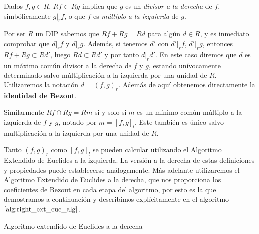 Dados \(f,g \in R\), \(Rf \subset Rg\) implica que \(g\) es un \textit{divisor a la derecha} de \(f\), simbólicamente \(g|_{r} f\), o que \(f\) es \textit{múltiplo a la izquierda} de \(g\).

Por ser \(R\) un DIP sabemos que \(Rf + Rg = Rd\) para algún \(d \in R\), y es inmediato comprobar que \(d |_r f\) y  \(d |_r g\). Además, si tenemos \(d'\) con \(d' |_r f\), \(d' |_r g\), entonces \(Rf + Rg \subset Rd'\), luego \(Rd \subset Rd'\) y por tanto  \(d |_r d'\). En este caso diremos que \(d\) es un máximo común divisor a la derecha de \(f\) y \(g\), estando unívocamente determinado salvo múltiplicación a la izquierda por una unidad de \(R\). Utilizaremos la notación \(d = {(f,g)}_r\). Además de aquí obtenemos directamente la \textbf{identidad de Bezout}.

Similarmente  \(Rf \cap Rg = Rm\) si y solo si \(m\) es un mínimo común múltiplo a la izquierda de \(f\) y \(g\), notado por \(m = {[f,g]}_l\). Este también es único salvo multiplicación a la izquierda por una unidad de \(R\).

Tanto \((f,g)_r\) como \([f,g]_l\) se pueden calcular utilizando el Algoritmo Extendido de Euclides a la izquierda. La versión a la derecha de estas definiciones y propiedades puede establecerse análogamente. Más adelante utilizaremos el Algoritmo Extendido de Euclides a la derecha, que nos proporciona los coeficientes de Bezout en cada etapa del algoritmo, por esto es la que demostramos a continuación y describimos explícitamente en el algoritmo \(\ref{alg:right_ext_euc_alg}\).

\begin{algorithm}[H]
 \label{alg:right_ext_euc_alg}
 \caption{Algoritmo extendido de Euclides a la derecha}
\end{algorithm}

